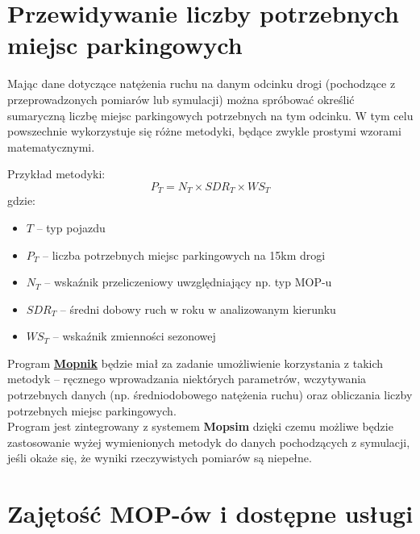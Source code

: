 \section{Przewidywanie liczby potrzebnych miejsc parkingowych}
Mając dane dotyczące natężenia ruchu na danym odcinku drogi (pochodzące z
przeprowadzonych pomiarów lub symulacji) można spróbować określić sumaryczną
liczbę miejsc parkingowych potrzebnych na tym odcinku. W tym celu powszechnie
wykorzystuje się różne metodyki, będące zwykle prostymi wzorami matematycznymi.

Przykład metodyki: 
$$ P_T = N_T \times SDR_T \times WS_T $$
gdzie:
\begin{itemize}
  \item $T$ -- typ pojazdu
  \item $P_T$ -- liczba potrzebnych miejsc parkingowych na 15km drogi
  \item $N_T$ -- wskaźnik przeliczeniowy uwzględniający np. typ MOP-u
  \item $SDR_T$ -- średni dobowy ruch w roku w analizowanym kierunku 
  \item $WS_T$ -- wskaźnik zmienności sezonowej
\end{itemize}
Program \hyperref[r:mopnik]{\textbf{Mopnik}} będzie miał za zadanie umożliwienie korzystania z
takich metodyk -- ręcznego wprowadzania niektórych parametrów,
wczytywania potrzebnych danych (np. średniodobowego natężenia ruchu)
oraz obliczania liczby potrzebnych miejsc parkingowych. \\
Program jest zintegrowany z systemem \textbf{Mopsim} dzięki
czemu możliwe będzie zastosowanie wyżej wymienionych metodyk do danych
pochodzących z symulacji, jeśli okaże się, że wyniki rzeczywistych pomiarów są
niepełne. 


\section{Zajętość MOP-ów i dostępne usługi}


